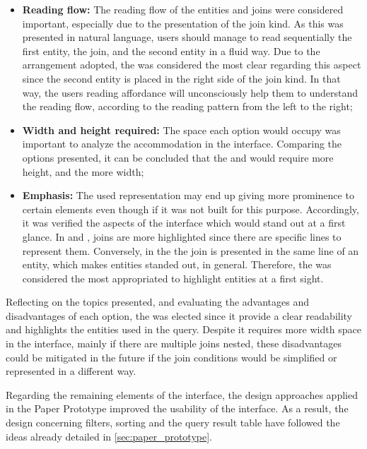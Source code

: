 \begin{itemize}
  \item \textbf{Reading flow: } The reading flow of the entities and joins were considered important, especially due to the presentation of the join kind. As this was presented in natural language, users should manage to read  sequentially the first entity, the join, and the second entity in a fluid way. Due to the arrangement adopted, the  was considered the most clear regarding this aspect since the second entity is placed in the right side of the join kind. In that way, the users reading affordance will unconsciously help them to understand the reading flow, according to the reading pattern from the left to the right;
  \item \textbf{Width and height required: }The space each option would occupy was important to analyze the accommodation in the interface. Comparing the options presented, it can be concluded that the  and  would require more height, and the  more width;
  \item \textbf{Emphasis: }The used representation may end up giving more prominence to certain elements even though if it was not built for this purpose. Accordingly, it was verified the aspects of the interface which would stand out at a first glance. In  and , joins are more highlighted since there are specific lines to represent them. Conversely, in the  the join is presented in the same line of an entity, which makes entities standed out, in general. Therefore, the  was considered the most appropriated to highlight entities at a first sight.
\end{itemize}

Reflecting on the topics presented, and evaluating the advantages and disadvantages of each option, the  was elected since it provide a clear readability and highlights the entities used in the query. Despite it requires more width space in the interface, mainly if there are multiple joins nested, these disadvantages could be mitigated in the future if the join conditions would be simplified or represented in a different way.

Regarding the remaining elements of the interface, the design approaches applied in the Paper Prototype improved the usability of the interface. As a result, the design concerning filters, sorting and the query result table have followed the ideas already detailed in \ref{sec:paper_prototype}.


